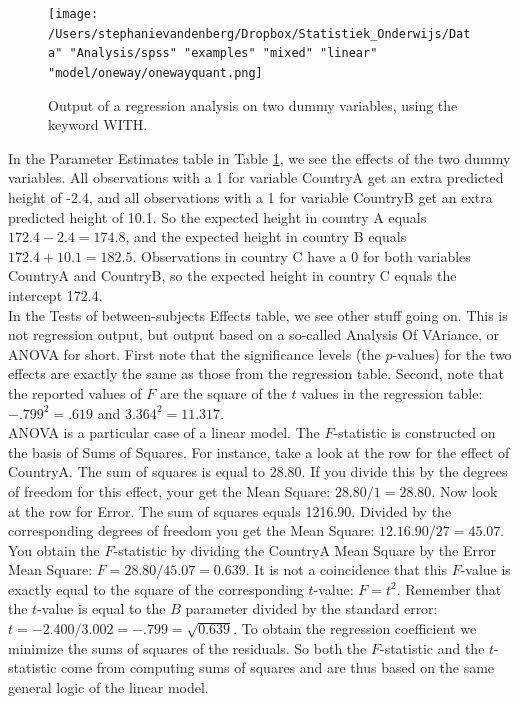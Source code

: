 \documentclass[]{report}\usepackage[]{graphicx}\usepackage[]{color}
\begin{document}
\begin{figure}[h]
    \begin{center}
       \texttt{[image: /Users/stephanievandenberg/Dropbox/Statistiek\_Onderwijs/Data" "Analysis/spss" "examples" "mixed" "linear" "model/oneway/onewayquant.png]}
    \end{center}
    \caption{Output of a regression analysis on two dummy variables, using the keyword WITH.}
    \label{tab:dummy_21}
\end{figure}


In the Parameter Estimates table in Table \ref{tab:dummy_21}, we see the effects of the two dummy variables. All observations with a 1 for variable CountryA get an extra predicted height of -2.4, and all observations with a 1 for variable CountryB get an extra predicted height of 10.1. So the expected height in country A equals $172.4 - 2.4 = 174.8$, and the expected height in country B equals $172.4+10.1=182.5 $. Observations in country C have a 0 for both variables CountryA and CountryB, so the expected height in country C equals the intercept 172.4.\\

In the Tests of between-subjects Effects table, we see other stuff going on. This is not regression output, but output based on a so-called Analysis Of VAriance, or ANOVA for short. First note that the significance levels (the $p$-values) for the two effects are exactly the same as those from the regression table. Second, note that the reported values of $F$ are the square of the $t$ values in the regression table: $-.799^2=.619$ and $3.364^2=11.317$. \\
ANOVA is a particular case of a linear model. The $F$-statistic is constructed on the basis of Sums of Squares. For instance, take a look at the row for the effect of CountryA. The sum of squares is equal to 28.80. If you divide this by the degrees of freedom for this effect, your get the Mean Square: $28.80/1=28.80$. Now look at the row for Error. The sum of squares equals 1216.90. Divided by the corresponding degrees of freedom you get the Mean Square: $12.16.90/27=45.07$. You obtain the $F$-statistic by dividing the CountryA Mean Square by the Error Mean Square: $F=28.80/45.07=0.639$.
It is not a coincidence that this $F$-value is exactly equal to the square of the corresponding $t$-value: $F=t^2$. Remember that the $t$-value is equal to the $B$ parameter divided by the standard error: $t=-2.400/3.002=-.799=\sqrt{0.639}$. To obtain the regression coefficient we minimize the sums of squares of the residuals. So both the $F$-statistic and the $t$-statistic come from computing sums of squares and are thus based on the same general logic of the linear model.\\
\end{document}
